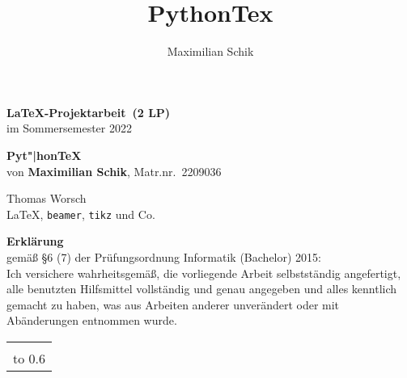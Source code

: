 \documentclass[11pt,a4paper]{article}
\author{Maximilian Schik}
\title{PythonTex}
\newcommand{\teilnehmername}{Maximilian Schik} %
\newcommand{\teilnehmermatrnr}{2209036}        %
\newcommand{\seminarart}{\LaTeX-Projektarbeit} %
\newcommand{\seminarlp}{2 LP}                  %
\newcommand{\seminarjahr}{2022}                %
\begin{document}
{\thispagestyle{empty}\large\sffamily\raggedright
%
%
\unskip %
\noindent \textbf{\Large \seminarart\ (\seminarlp)}
\\[\baselineskip]
%
%
im Sommersemester \seminarjahr

\vspace*{3\baselineskip}

\noindent \textbf{\Large Pyt"|hon\TeX{}} \\[\baselineskip]
%
von \textbf{\teilnehmername}, Matr.nr.~\teilnehmermatrnr

\vspace*{3\baselineskip}

%
%
Thomas Worsch\\[1ex]
%
\LaTeX, \texttt{beamer}, \texttt{tikz} und Co.\\[1ex]
%
}
\clearpage
{\thispagestyle{empty}\raggedright

\noindent \textbf{\Large Erklärung}\\[1ex]
gemäß \S 6 (7) der Prüfungsordnung Informatik (Bachelor) 2015: %
\\[\baselineskip]

\noindent
Ich versichere wahrheitsgemäß, die vorliegende Arbeit selbstständig
angefertigt, alle benutzten Hilfsmittel vollständig und genau
angegeben und alles kenntlich gemacht zu haben, was aus Arbeiten
anderer unverändert oder mit Abänderungen entnommen wurde.

\vspace*{30mm}
\noindent
\begin{tabular}{@{}l}
  \hline
   \\[-1ex]
  \hbox to 0.6\textwidth{(\teilnehmername, Matr.nr.~\teilnehmermatrnr) \hss}
\end{tabular}
}
\clearpage
\end{document}

